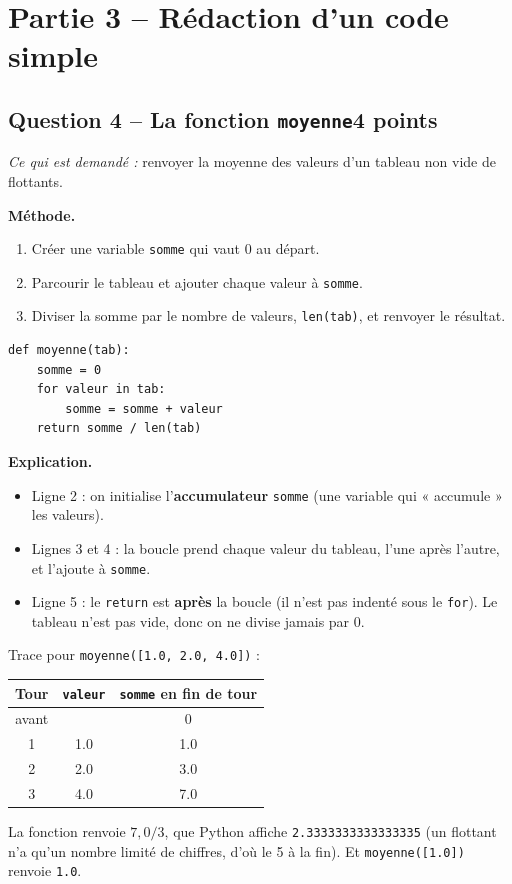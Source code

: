 \documentclass[11pt, a4paper]{exam}
\newcommand{\code}[1]{\texttt{#1}}
\newcommand{\Qt}[2]{\subsection*{#1\hfill{\normalfont\small #2}}}
\newcommand{\rappel}[1]{\noindent\textit{Ce qui est demandé :} #1\par\smallskip}
\newcommand{\methode}{\noindent\textbf{Méthode.}\ }
\newcommand{\explication}{\noindent\textbf{Explication.}\ }
\begin{document}
\section*{Partie 3 -- Rédaction d'un code simple}

\Qt{Question 4 -- La fonction \code{moyenne}}{4 points}
\rappel{renvoyer la moyenne des valeurs d'un tableau non vide de flottants.}

\methode
\begin{enumerate}
\item Créer une variable \code{somme} qui vaut 0 au départ.
\item Parcourir le tableau et ajouter chaque valeur à \code{somme}.
\item Diviser la somme par le nombre de valeurs, \code{len(tab)}, et renvoyer le résultat.
\end{enumerate}

\begin{reponse}
\begin{lstlisting}
def moyenne(tab):
    somme = 0
    for valeur in tab:
        somme = somme + valeur
    return somme / len(tab)
\end{lstlisting}
\end{reponse}

\explication
\begin{itemize}
\item Ligne 2 : on initialise l'\textbf{accumulateur} \code{somme} (une variable qui « accumule » les valeurs).
\item Lignes 3 et 4 : la boucle prend chaque valeur du tableau, l'une après l'autre, et l'ajoute à \code{somme}.
\item Ligne 5 : le \code{return} est \textbf{après} la boucle (il n'est pas indenté sous le \code{for}). Le tableau n'est pas vide, donc on ne divise jamais par 0.
\end{itemize}

Trace pour \code{moyenne([1.0, 2.0, 4.0])} :
\begin{center}\small
\begin{tabular}{|c|c|c|}\hline
Tour & \code{valeur} & \code{somme} en fin de tour \\\hline
avant & & 0 \\
1 & 1.0 & 1.0 \\
2 & 2.0 & 3.0 \\
3 & 4.0 & 7.0 \\\hline
\end{tabular}
\end{center}
La fonction renvoie $7{,}0 / 3$, que Python affiche \code{2.3333333333333335} (un flottant n'a qu'un nombre limité de chiffres, d'où le 5 à la fin). Et \code{moyenne([1.0])} renvoie \code{1.0}.
\end{document}
